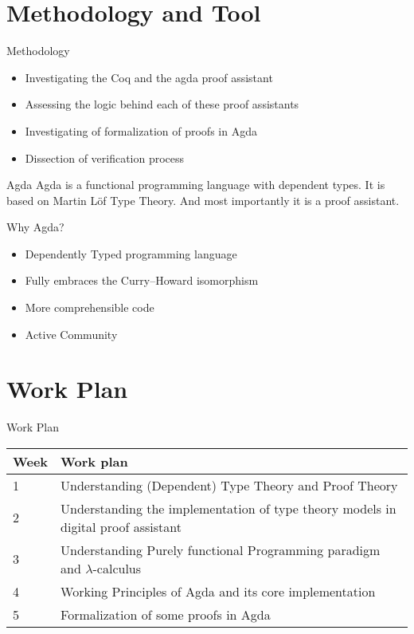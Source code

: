 \documentclass{beamer}
\begin{document}
\section{Methodology and Tool}
\begin{frame}{Methodology}
    \begin{itemize}
      \item Investigating the Coq and the agda proof assistant
      \item Assessing the logic behind each of these proof assistants
      \item Investigating of formalization of proofs in Agda
      \item Dissection of verification process
    \end{itemize}
\end{frame}
\begin{frame}{Agda}
Agda is a functional programming language with dependent types. It is based on Martin Löf Type Theory. And most importantly it is a proof assistant.
\cite{inproceedings}
\end{frame}
\begin{frame}{Why Agda?}
  \begin{itemize}
    \item Dependently Typed programming language
    \item Fully embraces the Curry–Howard isomorphism
    \item More comprehensible code
    \item Active Community
  \end{itemize}
\end{frame}

\section{Work Plan}
\begin{frame}{Work Plan}
  \begin{center}
    \begin{tabular}{p{1cm} p{8cm}}
        \hline
        Week & Work plan \\
        \hline
         1 & Understanding (Dependent) Type Theory and Proof Theory\\
        \hline
         2 & Understanding the implementation of type theory models in digital proof assistant \\
        \hline
         3 & Understanding Purely functional Programming paradigm and $ \lambda $-calculus\\
        \hline
         4 & Working Principles of Agda and its core implementation \\
        \hline 
         5 & Formalization of some proofs in Agda \\
        \hline


    \end{tabular}
\end{center}
\end{frame}
\end{document}
